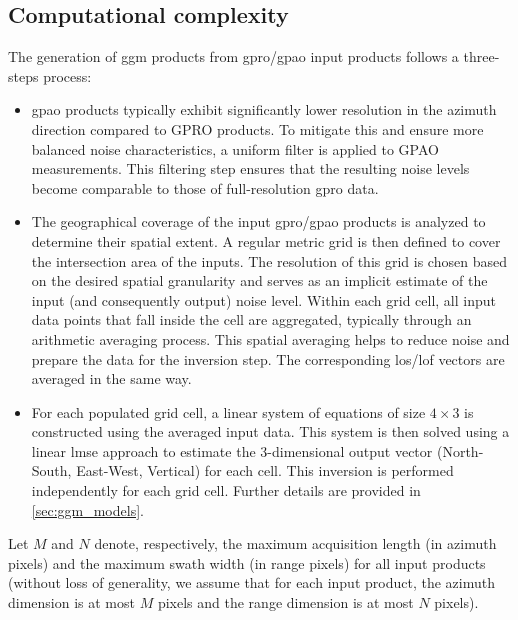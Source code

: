 \subsection{Computational complexity}
\label{sec:ggm_computation}

The generation of \acs{ggm} products from \acs{gpro}/\acs{gpao} input products follows a three-steps process:

\begin{itemize}
    \item \acs{gpao} products typically exhibit significantly lower resolution in the azimuth direction compared to GPRO products. To mitigate this and ensure more balanced noise characteristics, a uniform filter is applied to GPAO measurements. This filtering step ensures that the resulting noise levels become comparable to those of full-resolution \acs{gpro} data.

    \item The geographical coverage of the input \acs{gpro}/\acs{gpao} products is analyzed to determine their spatial extent. A regular metric grid is then defined to cover the intersection area of the inputs. The resolution of this grid is chosen based on the desired spatial granularity and serves as an implicit estimate of the input (and consequently output) noise level. Within each grid cell, all input data points that fall inside the cell are aggregated, typically through an arithmetic averaging process. This spatial averaging helps to reduce noise and prepare the data for the inversion step. The corresponding \acs{los}/\acs{lof} vectors are averaged in the same way.

    \item For each populated grid cell, a linear system of equations of size \( 4 \times 3 \) is constructed using the averaged input data. This system is then solved using a linear \acs{lmse} approach to estimate the 3-dimensional output vector (North-South, East-West, Vertical) for each cell. This inversion is performed independently for each grid cell. Further details are provided in \ref{sec:ggm_models}.
\end{itemize}

Let \( M \) and \( N \) denote, respectively, the maximum acquisition length (in azimuth pixels) and the maximum swath width (in range pixels) for all input products (without loss of generality, we assume that for each input product, the azimuth dimension is at most \( M \) pixels and the range dimension is at most \( N \) pixels).

